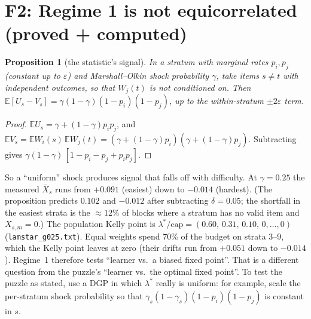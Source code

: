 \documentclass[11pt]{article}
\newtheorem{proposition}{Proposition}
\newcommand{\E}{\mathbb{E}}
\begin{document}
\section{F2: Regime 1 is not equicorrelated (proved + computed)}
\begin{proposition}[the statistic's signal]\label{prop:signal}
In a stratum with marginal rates $p_i,p_j$ (constant up to $\varepsilon$) and Marshall--Olkin shock probability $\gamma$, take items $s\neq t$ with independent outcomes, so that $W_j(t)$ is \emph{not} conditioned on. Then
$\E[U_s-V_s]=\gamma(1-\gamma)(1-p_i)(1-p_j)$, up to the within-stratum $\pm2\varepsilon$ term.
\end{proposition}
\begin{proof}
$\E U_s=\gamma+(1-\gamma)p_ip_j$, and $\E V_s=\E W_i(s)\,\E W_j(t)=(\gamma+(1-\gamma)p_i)(\gamma+(1-\gamma)p_j)$. Subtracting gives $\gamma(1-\gamma)\,[1-p_i-p_j+p_ip_j]$.
\end{proof}
So a ``uniform'' shock produces signal that falls off with difficulty. At $\gamma=0.25$ the measured $\bar X_s$ runs from $+0.091$ (easiest) down to $-0.014$ (hardest). (The proposition predicts $0.102$ and $-0.012$ after subtracting $\delta=0.05$; the shortfall in the easiest strata is the $\approx12\%$ of blocks where a stratum has no valid item and $X_{s,m}=0$.) The population Kelly point is
$\lambda^\ast/\mathrm{cap}=(0.60,\,0.31,\,0.10,\,0,\dots,0)$ (\texttt{lamstar\_g025.txt}). Equal weights spend 70\% of the budget on strata 3--9, which the Kelly point leaves at zero (their drifts run from $+0.051$ down to $-0.014$). Regime~1 therefore tests ``learner vs.\ a biased fixed point''. That is a different question from the puzzle's ``learner vs.\ the optimal fixed point''. To test the puzzle as stated, use a DGP in which $\lambda^\ast$ really is uniform: for example, scale the per-stratum shock probability so that $\gamma_s(1-\gamma_s)(1-p_i)(1-p_j)$ is constant in $s$.
\end{document}
